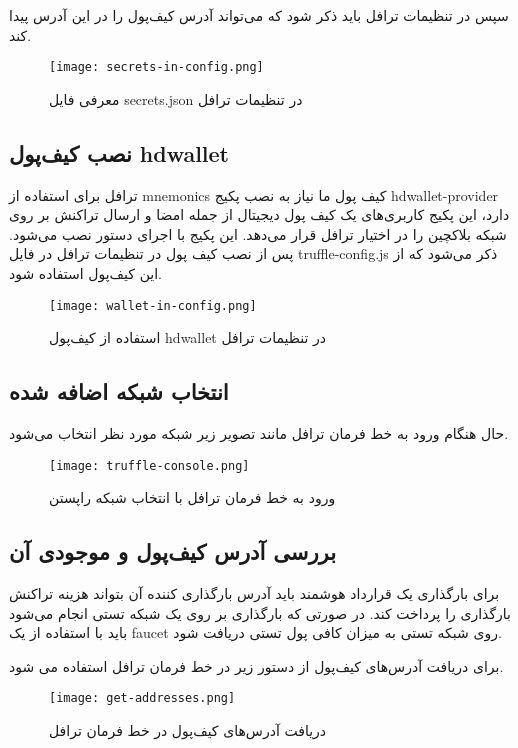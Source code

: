 سپس در تنظیمات ترافل باید ذکر شود که می‌تواند آدرس کیف‌پول را در این آدرس پیدا کند.

\begin{figure}[ht]
\centerline{\texttt{[image: secrets-in-config.png]}}
\caption{معرفی فایل secrets.json در تنظیمات ترافل}
\label{fig:secrets-in-config}
\end{figure}


\subsection{نصب کیف‌پول hdwallet}
ترافل برای استفاده از mnemonics کیف پول ما نیاز به نصب پکیج hdwallet-provider دارد، این پکیج کاربری‌های یک کیف پول دیجیتال از جمله امضا و ارسال تراکنش بر روی شبکه بلاکچین را در اختیار ترافل قرار می‌دهد. این پکیج با اجرای دستور
نصب می‌شود.  پس از نصب کیف پول در تنظیمات ترافل در فایل truffle-config.js ذکر می‌شود که از این کیف‌پول استفاده شود.

\begin{figure}[ht]
\centerline{\texttt{[image: wallet-in-config.png]}}
\caption{استفاده از کیف‌پول hdwallet در تنظیمات ترافل}
\label{fig:wallet-in-config}
\end{figure}


\subsection{انتخاب شبکه اضافه شده}
حال هنگام ورود به خط فرمان ترافل مانند تصویر زیر شبکه مورد نظر انتخاب می‌شود.

\begin{figure}[ht]
\centerline{\texttt{[image: truffle-console.png]}}
\caption{ورود به خط فرمان ترافل با انتخاب شبکه راپستن}
\label{fig:truffle-console}
\end{figure}


\subsection{بررسی آدرس کیف‌پول و موجودی آن}
برای بارگذاری یک قرارداد هوشمند باید آدرس بارگذاری کننده آن بتواند هزینه تراکنش بارگذاری را پرداخت کند. در صورتی که بارگذاری بر روی یک شبکه تستی انجام می‌شود باید با استفاده از یک faucet روی شبکه تستی به میزان کافی پول تستی دریافت شود.

برای دریافت آدرس‌های کیف‌پول از دستور زیر در خط فرمان ترافل استفاده می شود.

\begin{figure}[ht]
\centerline{\texttt{[image: get-addresses.png]}}
\caption{دریافت آدرس‌های کیف‌پول در خط فرمان ترافل}
\label{fig:get-addresses}
\end{figure}


